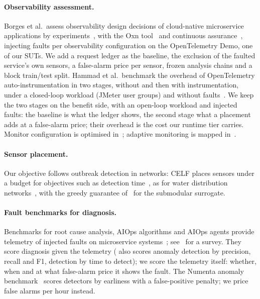 \documentclass{ceurart}
\begin{document}
\paragraph{Observability assessment.} Borges et al.\ assess observability design decisions of cloud-native microservice
applications by experiments~\cite{borges2024informed}, with the Oxn tool~\cite{borges2024oxn} and continuous
assurance~\cite{borges2025continuous}, injecting faults per observability configuration on the OpenTelemetry Demo, one of
our SUTs. We add a request ledger as the baseline, the exclusion of the faulted service's own sensors, a false-alarm price
per sensor, frozen analysis chains and a block train/test split. Hammad et al.\ benchmark the overhead of OpenTelemetry
auto-instrumentation in two stages, without and then with instrumentation, under a closed-loop workload (JMeter user groups)
and without faults~\cite{hammad_empirical_2025}. We keep the two stages on the benefit side, with an open-loop workload and
injected faults: the baseline is what the ledger shows, the second stage what a placement adds at a false-alarm price; their
overhead is the cost our runtime tier carries. Monitor configuration is optimised
in~\cite{heward_optimizing_2010}; adaptive monitoring is mapped in~\cite{zavala_adaptive_2019}.

\paragraph{Sensor placement.} Our objective follows outbreak detection in networks: CELF places sensors under a budget for objectives such as
detection time~\cite{leskovec_cost-effective_2007}, as for water distribution
networks~\cite{krause_andreas_efficient_2008}, with the greedy guarantee of~\cite{nemhauser_analysis_1978} for the
submodular surrogate.

\paragraph{Fault benchmarks for diagnosis.} Benchmarks for root cause analysis, AIOps algorithms and AIOps agents provide
telemetry of injected faults on microservice
systems~\cite{pham_rcaeval_2025,fang2026rethinking,sun2024scenario,chen2025aiopslab}; see~\cite{zhang_failure_2025} for a
survey. They score diagnosis given the telemetry (\cite{sun2024scenario} also scores anomaly detection by precision, recall
and F1, \cite{chen2025aiopslab} detection by time to detect); we score the telemetry itself: whether, when and at what
false-alarm price it shows the fault. The Numenta anomaly benchmark~\cite{lavin2015nab} scores detectors by earliness with a
false-positive penalty; we price false alarms per hour instead.
\end{document}
